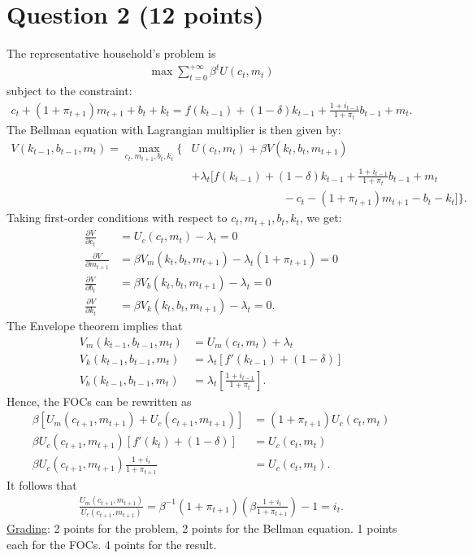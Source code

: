 \documentclass[12pt]{article}
\begin{document}
\section*{Question 2 (12 points)}
The representative household's problem is 
\begin{align*}
    \max \sum_{t=0}^{+\infty} \beta^t U(c_t, m_t)
\end{align*}
subject to the constraint:
\begin{align*}
    c_t + (1+\pi_{t+1}) m _{t+1} + b_t + k_t = f(k_{t-1}) + (1-\delta) k_{t-1} + \frac{1+i_{t-1}}{1+\pi_t} b_{t-1} + m_t.
\end{align*}
The Bellman equation with Lagrangian multiplier is then given by:
\begin{align*}
    V(k_{t-1}, b_{t-1}, m_t) = \max_{c_t, m_{t+1}, b_t, k_t} \Bigg\{ & U(c_t, m_t) + \beta V(k_t, b_t, m_{t+1})\\
    & + \lambda_t \bigg[f(k_{t-1}) + (1-\delta) k_{t-1} + \frac{1+i_{t-1}}{1+\pi_t} b_{t-1} + m_t\\
    & \qquad \qquad \qquad \qquad - c_t - (1+\pi_{t+1}) m_{t+1} - b_t - k_t\bigg] \Bigg\}.
\end{align*}
Taking first-order conditions with respect to $c_t, m_{t+1}, b_t, k_t$, we get:
\begin{align*}
    \frac{\partial V}{\partial c_t} &= U_c(c_t, m_t) - \lambda_t = 0\\
    \frac{\partial V}{\partial m_{t+1}} &= \beta V_m(k_t, b_t, m_{t+1}) - \lambda_t (1+\pi_{t+1}) = 0\\
    \frac{\partial V}{\partial b_t} &= \beta V_b(k_t, b_t, m_{t+1}) - \lambda_t = 0\\
    \frac{\partial V}{\partial k_t} &= \beta V_k(k_t, b_t, m_{t+1}) - \lambda_t = 0.
\end{align*}
The Envelope theorem implies that
\begin{align*}
    V_m(k_{t-1}, b_{t-1}, m_t) &= U_m(c_t, m_t) + \lambda_t\\
    V_k(k_{t-1}, b_{t-1}, m_t) &= \lambda_t\left[f'(k_{t-1}) + (1-\delta)\right]\\
    V_b(k_{t-1}, b_{t-1}, m_t) &= \lambda_t\left[\frac{1+i_{t-1}}{1+\pi_t}\right].
\end{align*}
Hence, the FOCs can be rewritten as
\begin{align*}
    \beta\left[U_m(c_{t+1}, m_{t+1}) + U_c(c_{t+1}, m_{t+1})\right] &= (1+\pi_{t+1})U_c(c_t,m_t)\\
    \beta U_c(c_{t+1}, m_{t+1})\left[f'(k_{t}) + (1-\delta)\right] &= U_c(c_t, m_t)\\
    \beta U_c(c_{t+1}, m_{t+1}) \frac{1+i_t}{1+\pi_{t+1}} &= U_c(c_t, m_t).
\end{align*}
It follows that
\begin{align*}
    \frac{U_m(c_{t+1}, m_{t+1})}{U_c(c_{t+1}, m_{t+1})} = \beta^{-1}(1+\pi_{t+1})\left(\beta \frac{1+i_t}{1+\pi_{t+1}} \right) - 1 = i_t.
\end{align*}
\underline{Grading}: 2 points for the problem, 2 points for the Bellman equation. 1 points each for the FOCs. 4 points for the result.
\end{document}
